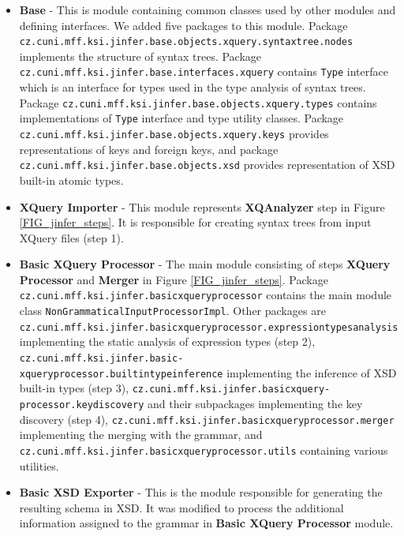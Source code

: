\begin{itemize}
\item \textbf{Base} - This is module containing common classes used by other modules and defining interfaces. We added five packages to this module. Package \texttt{cz.cuni.mff.ksi.jinfer.base.objects.xquery.syntaxtree.nodes} implements the structure of syntax trees. Package \texttt{cz.cuni.mff.ksi.jinfer\-.base.interfaces.xquery} contains \texttt{Type} interface which is an interface for types used in the type analysis of syntax trees. Package \texttt{cz.cuni.mff.ksi\-.jinfer.base\-.objects.xquery.types} contains implementations of \texttt{Type} interface and type utility classes. Package \texttt{cz.cuni.mff.ksi.jinfer\-.base\-.objects.xquery.keys} provides representations of keys and foreign keys, and package \texttt{cz.cuni.mff.ksi\-.jinfer.base.objects.xsd} provides representation of XSD built-in atomic types.
\item \textbf{XQuery Importer} - This module represents \textbf{XQAnalyzer} step in Figure \ref{FIG_jinfer_steps}. It is responsible for creating syntax trees from input XQuery files (step 1).
\item \textbf{Basic XQuery Processor} - The main module consisting of steps \textbf{XQuery Processor} and \textbf{Merger} in Figure \ref{FIG_jinfer_steps}. Package \texttt{cz.cuni.mff.ksi.jinfer\-.basicxqueryprocessor} contains the main module class \texttt{NonGrammatical\-InputProcessorImpl}. Other packages are \texttt{cz.cuni.mff.ksi.jinfer.\-basicxqueryprocessor.expressiontypesanalysis} implementing the static analysis of expression types (step 2), \texttt{cz.cuni.mff.ksi.jinfer.basic-\\xqueryprocessor.builtintype\-inference} implementing the inference of XSD built-in types (step 3), \texttt{cz\-.cuni.mff\-.ksi.jinfer\-.basicxquery-\\processor.keydiscovery} and their subpackages implementing the key discovery (step 4), \texttt{cz.cuni.mff.ksi.jinfer.basicxqueryprocessor.merger} implementing the merging with the grammar, and \texttt{cz.cuni.mff.ksi.jinfer\-.basicxqueryprocessor.utils} containing various utilities.
\item \textbf{Basic XSD Exporter} - This is the module responsible for generating the resulting schema in XSD. It was modified to process the additional information assigned to the grammar in \textbf{Basic XQuery Processor} module.
\end{itemize}